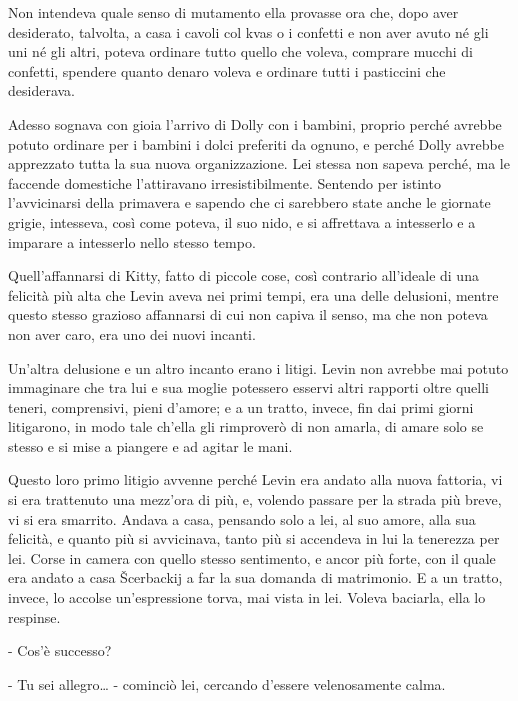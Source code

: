 Non intendeva quale senso di mutamento ella provasse ora che, dopo aver desiderato, talvolta, a casa i cavoli col kvas o i confetti e non aver avuto né gli uni né gli altri, poteva ordinare tutto quello che voleva, comprare mucchi di confetti, spendere quanto denaro voleva e ordinare tutti i pasticcini che desiderava. 

Adesso sognava con gioia l'arrivo di Dolly con i bambini, proprio perché avrebbe potuto ordinare per i bambini i dolci preferiti da ognuno, e perché Dolly avrebbe apprezzato tutta la sua nuova organizzazione. Lei stessa non sapeva perché, ma le faccende domestiche l'attiravano irresistibilmente. Sentendo per istinto l'avvicinarsi della primavera e sapendo che ci sarebbero state anche le giornate grigie, intesseva, così come poteva, il suo nido, e si affrettava a intesserlo e a imparare a intesserlo nello stesso tempo. 

Quell'affannarsi di Kitty, fatto di piccole cose, così contrario all'ideale di una felicità più alta che Levin aveva nei primi tempi, era una delle delusioni, mentre questo stesso grazioso affannarsi di cui non capiva il senso, ma che non poteva non aver caro, era uno dei nuovi incanti. 

Un'altra delusione e un altro incanto erano i litigi. Levin non avrebbe mai potuto immaginare che tra lui e sua moglie potessero esservi altri rapporti oltre quelli teneri, comprensivi, pieni d'amore; e a un tratto, invece, fin dai primi giorni litigarono, in modo tale ch'ella gli rimproverò di non amarla, di amare solo se stesso e si mise a piangere e ad agitar le mani. 

Questo loro primo litigio avvenne perché Levin era andato alla nuova fattoria, vi si era trattenuto una mezz'ora di più, e, volendo passare per la strada più breve, vi si era smarrito. Andava a casa, pensando solo a lei, al suo amore, alla sua felicità, e quanto più si avvicinava, tanto più si accendeva in lui la tenerezza per lei. Corse in camera con quello stesso sentimento, e ancor più forte, con il quale era andato a casa Šcerbackij a far la sua domanda di matrimonio. E a un tratto, invece, lo accolse un'espressione torva, mai vista in lei. Voleva baciarla, ella lo respinse. 

- Cos'è successo? 

- Tu sei allegro\ldots{} - cominciò lei, cercando d'essere velenosamente calma. 

